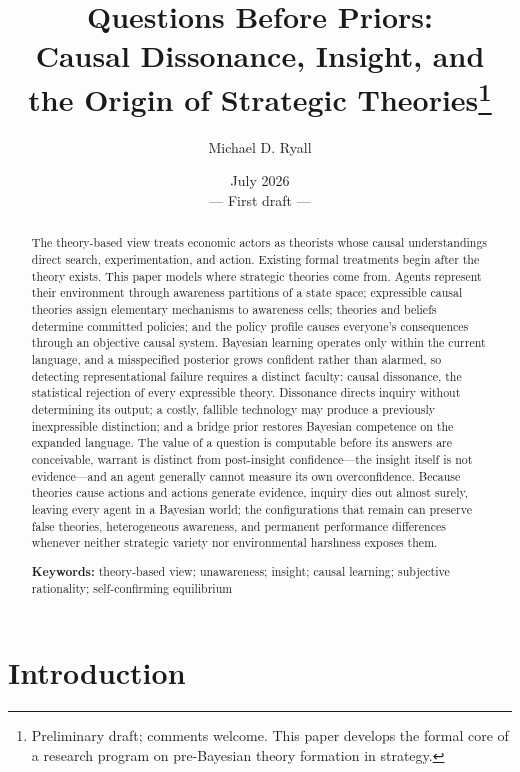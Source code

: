 \documentclass[11pt]{article}
\title{\textbf{Questions Before Priors:}\\
Causal Dissonance, Insight, and the Origin of Strategic Theories\thanks{%
Preliminary draft; comments welcome.  This paper develops the formal core of
a research program on pre-Bayesian theory formation in strategy.}}
\author{Michael D. Ryall}
\date{July 2026\\[0.4em]\normalsize --- First draft ---}
\theoremstyle{definition}
\begin{document}
\maketitle

\begin{abstract}
\noindent
The theory-based view treats economic actors as theorists whose causal
understandings direct search, experimentation, and action.  Existing formal
treatments begin after the theory exists.  This paper models where strategic
theories come from.  Agents represent their environment through awareness
partitions of a state space; expressible causal theories assign elementary
mechanisms to awareness cells; theories and beliefs determine committed
policies; and the policy profile causes everyone's consequences through an
objective causal system.  Bayesian learning operates only within the current
language, and a misspecified posterior grows confident rather than alarmed,
so detecting representational failure requires a distinct faculty: causal
dissonance, the statistical rejection of every expressible theory.
Dissonance directs inquiry without determining its output; a costly, fallible
technology may produce a previously inexpressible distinction; and a bridge
prior restores Bayesian competence on the expanded language.  The value of a
question is computable before its answers are conceivable, warrant is
distinct from post-insight confidence---the insight itself is not
evidence---and an agent generally cannot measure its own overconfidence.
Because theories cause actions and actions generate evidence, inquiry dies
out almost surely, leaving every agent in a Bayesian world; the
configurations that remain can preserve false theories, heterogeneous
awareness, and permanent performance differences whenever neither strategic
variety nor environmental harshness exposes them.
\medskip

\noindent\textbf{Keywords:} theory-based view; unawareness; insight; causal
learning; subjective rationality; self-confirming equilibrium
\end{abstract}

\newpage

\section{Introduction}
\label{sec:intro}
\end{document}
